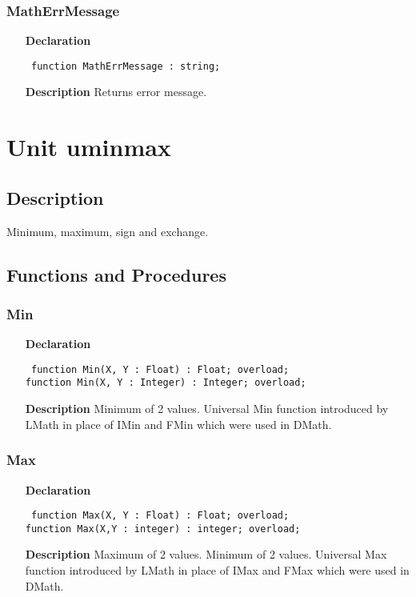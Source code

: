 \documentclass[12pt,a4paper,oneside]{report}
\newcommand{\lmath}[1]{   %
	\marginpar{\vspace{#1} 
		\begin{flushright}
			LMath
	\end{flushright} }
}
\newcommand{\declarationitem}[1]{\textbf{#1}}
\newcommand{\descriptiontitle}[1]{\textbf{#1}}
\newcommand{\code}[1]{\texttt{#1}}
\begin{document}
\subsubsection{MathErrMessage}
\lmath{-24pt}
\label{uErrors-MathErrMessage}
\begin{itemize}\item[\declarationitem{Declaration}\hfill]
	\begin{flushleft}
		\code{
			function MathErrMessage : string;}
	\end{flushleft}
	\item[\descriptiontitle{Description}]
	Returns error message.
\end{itemize}

\section{Unit uminmax}
\label{uminmax}
\subsection{Description}
Minimum, maximum, sign and exchange. 
\subsection{Functions and Procedures}
\subsubsection{Min}\lmath{-24pt}
\label{uminmax-Min}
\begin{itemize}\item[\declarationitem{Declaration}\hfill]
	\begin{flushleft}
		\code{
			function Min(X, Y : Float) : Float; overload;\\
			function Min(X, Y : Integer) : Integer; overload;}
	\end{flushleft}
	\item[\descriptiontitle{Description}]
	Minimum of 2 values. Universal Min function introduced by LMath in place of IMin and FMin which were used in DMath.
\end{itemize}
\subsubsection{Max}\lmath{-24pt}
\label{uminmax-Max}
\begin{itemize}\item[\declarationitem{Declaration}\hfill]
	\begin{flushleft}
		\code{
			function Max(X, Y : Float) : Float; overload;\\
			function Max(X,Y : integer) : integer; overload;}
	\end{flushleft}
	\item[\descriptiontitle{Description}]
	Maximum of 2 values. 	Minimum of 2 values.  Universal Max function introduced by LMath in place of IMax and FMax which were used in DMath.
	
\end{itemize}
\end{document}
